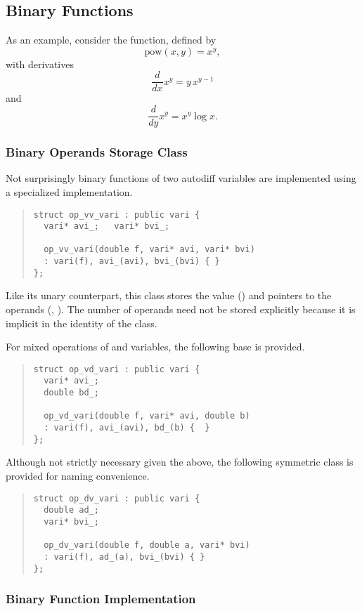 \documentclass[10pt]{article}
\begin{document}
\subsection{Binary Functions}

As an example, consider the  function, defined by
\[
\mbox{pow}(x,y) = x^y,
\]
with derivatives
\[
\frac{d}{dx} x^y = y \, x^{y-1}
\]
and
\[
\frac{d}{dy} x^y = x^y \log x.
\]


\subsubsection{Binary Operands Storage Class}

Not surprisingly binary functions of two autodiff variables are
implemented using a specialized  implementation.
%
\begin{quote}
\begin{Verbatim}
struct op_vv_vari : public vari {
  vari* avi_;   vari* bvi_;

  op_vv_vari(double f, vari* avi, vari* bvi)
  : vari(f), avi_(avi), bvi_(bvi) { }
};
\end{Verbatim}
\end{quote}
%
Like its unary counterpart, this class stores the value () and
pointers to the operands (, ).  The number of
operands need not be stored explicitly because it is implicit in the
identity of the class. 

For mixed operations of  and  variables, the
following base  is provided.
%
\begin{quote}
\begin{Verbatim}
struct op_vd_vari : public vari {
  vari* avi_;
  double bd_;

  op_vd_vari(double f, vari* avi, double b)
  : vari(f), avi_(avi), bd_(b) {  }
};
\end{Verbatim}
\end{quote}
%
Although not strictly necessary given the above, the following
symmetric class is provided for naming convenience.
%
\begin{quote}
\begin{Verbatim}
struct op_dv_vari : public vari {
  double ad_;
  vari* bvi_;

  op_dv_vari(double f, double a, vari* bvi)
  : vari(f), ad_(a), bvi_(bvi) { }
};
\end{Verbatim}
\end{quote}
%

\subsubsection{Binary Function Implementation}
\end{document}
